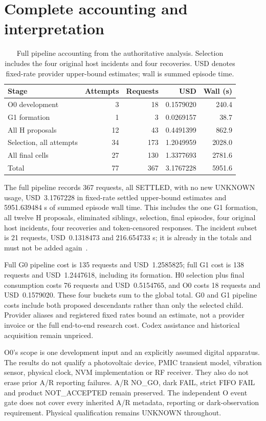 \section{Complete accounting and interpretation}
\begin{table}[htbp]
\centering\small
\caption{Full pipeline accounting from the authoritative analysis. Selection includes the four original host incidents and four recoveries. USD denotes fixed-rate provider upper-bound estimates; wall is summed episode time.}
\label{tab:cost}
\begin{tabular}{@{}lrrrr@{}}\toprule
Stage & Attempts & Requests & USD & Wall (s) \\\midrule
O0 development & 3 & 18 & 0.1579020 & 240.4 \\
G1 formation & 1 & 3 & 0.0269157 & 38.7 \\
All H proposals & 12 & 43 & 0.4491399 & 862.9 \\
Selection, all attempts & 34 & 173 & 1.2049959 & 2028.0 \\
All final cells & 27 & 130 & 1.3377693 & 2781.6 \\
Total & 77 & 367 & 3.1767228 & 5951.6 \\
\bottomrule\end{tabular}
\end{table}

The full pipeline records 367 requests, all SETTLED, with no new UNKNOWN usage,
USD~3.1767228 in fixed-rate settled upper-bound estimates and 5951.639484 s of
summed episode wall time. This includes the one G1 formation, all twelve H
proposals, eliminated siblings, selection, final episodes, four original host
incidents, four recoveries and token-censored responses. The incident subset
is 21 requests, USD~0.1318473 and 216.654733 s; it is already in the totals
and must not be added again~\cite{analysis}.

Full G0 pipeline cost is 135 requests and USD~1.2585825; full G1 cost is
138 requests and USD~1.2447618, including its formation. H0 selection plus
final consumption costs 76 requests and USD~0.5154765, and O0 costs 18 requests
and USD~0.1579020. These four buckets sum to the global total. G0 and G1 pipeline
costs include both proposed descendants rather than only the selected child.
Provider aliases and registered fixed rates bound an estimate, not a provider
invoice or the full end-to-end research cost. Codex assistance and historical
acquisition remain unpriced.

O0's scope is one development input and an explicitly assumed digital apparatus.
The results do not qualify a photovoltaic device, PMIC transient model,
vibration sensor, physical clock, NVM implementation or RF receiver. They also
do not erase prior A/R reporting failures. A/R NO\_GO, dark FAIL, strict FIFO
FAIL and product NOT\_ACCEPTED remain preserved. The independent O event gate
does not cover every inherited A/R metadata, reporting or dark-observation
requirement. Physical qualification remains UNKNOWN throughout.

